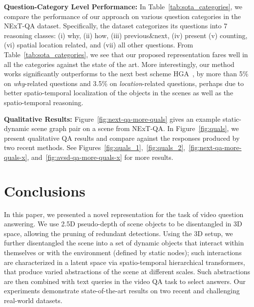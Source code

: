 \documentclass[letterpaper]{article} %
\begin{document}
\noindent\textbf{Question-Category Level Performance:} In Table~\ref{tab:sota_categories}, we compare the performance of our \name approach on various question categories in the NExT-QA dataset. Specifically, the dataset categorizes its questions into 7 reasoning classes: (i) why, (ii) how, (iii) previous\&next, (iv) present (v) counting, (vi) spatial location related, and (vii) all other questions. From Table~\ref{tab:sota_categories}, we see that our proposed representation fares well in all the categories against the state of the art. More interestingly, our method works significantly outperforms to the next best scheme HGA~\cite{jiang2020reasoning}, by more than 5\% on \emph{why}-related questions and 3.5\% on \emph{location}-related questions, perhaps due to better spatio-temporal localization of the objects in the scenes as well as the spatio-temporal reasoning.

\noindent\textbf{Qualitative Results:} Figure~\ref{fig:next-qa-more-quals} gives an example static-dynamic scene graph pair on a scene from NExT-QA. In Figure~\ref{fig:quals}, we present qualitative QA results and compare against the responses produced by two recent methods.  See  Figures~\ref{fig:quals_1},~\ref{fig:quals_2},~\ref{fig:next-qa-more-quals-x}, and~\ref{fig:avsd-qa-more-quals-x} for more results.

\section{Conclusions}
In this paper, we presented a novel \name representation for the task of video question answering. We use 2.5D pseudo-depth of scene objects to be disentangled in 3D space, allowing the pruning of redundant detections. Using the 3D setup, we further disentangled the scene into a set of dynamic objects that interact within themselves or with the environment (defined by static nodes); such interactions are characterized in a latent space via spatio-temporal hierarchical transformers, that produce varied abstractions of the scene at different scales. Such abstractions are then combined with text queries in the video QA task to select answers. Our experiments demonstrate state-of-the-art results on two recent and challenging real-world datasets. %
\end{document}
